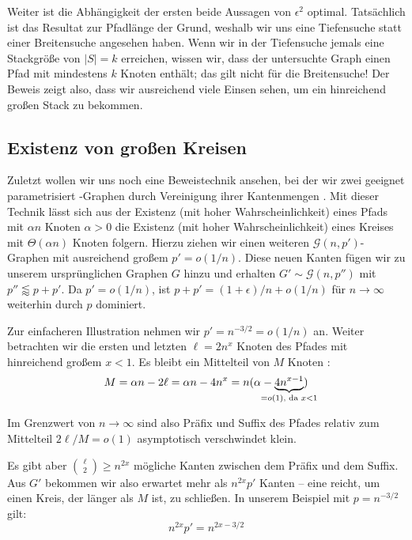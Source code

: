 Weiter ist die Abhängigkeit der ersten beide Aussagen von $\epsilon^2$ optimal.
Tatsächlich ist das Resultat zur Pfadlänge der Grund, weshalb wir uns eine Tiefensuche statt einer Breitensuche angesehen haben.
Wenn wir in der Tiefensuche jemals eine Stackgröße von $|S| = k$ erreichen, wissen wir, dass der untersuchte Graph einen Pfad mit mindestens $k$ Knoten enthält;
das gilt nicht für die Breitensuche!
Der Beweis zeigt also, dass wir ausreichend viele Einsen sehen, um ein hinreichend großen Stack zu bekommen.

\subsection{Existenz von großen Kreisen}
Zuletzt wollen wir uns noch eine Beweistechnik ansehen, bei der wir zwei geeignet parametrisiert \Gnp-Graphen durch Vereinigung ihrer Kantenmengen .
Mit dieser Technik lässt sich aus der Existenz (mit hoher Wahrscheinlichkeit) eines Pfads mit $\alpha n$ Knoten $\alpha > 0$ die Existenz (mit hoher Wahrscheinlichkeit) eines Kreises mit $\Theta(\alpha n)$ Knoten folgern.
Hierzu ziehen wir einen weiteren $\mathcal G(n, p')$-Graphen mit ausreichend großem $p' = o(1/n)$.
Diese neuen Kanten fügen wir zu unserem ursprünglichen Graphen $G$ hinzu und erhalten $G' \sim \mathcal G(n, p'')$ mit $p'' \lessapprox p + p'$.
Da $p' = o(1/n)$, ist $p + p' = (1+\epsilon)/n + o(1/n)$ für $n \to \infty$ weiterhin durch $p$ dominiert.

Zur einfacheren Illustration nehmen wir $p' = n^{-3/2} = o(1/n)$ an.
Weiter betrachten wir die ersten und letzten $\ell = 2 n^x$ Knoten des Pfades mit hinreichend großem $x < 1$.
Es bleibt ein Mittelteil von $M$ Knoten :
\begin{equation}
    M = \alpha n - 2\ell =\alpha n - 4 n^x =  n(\alpha - \underbrace{4n^{x - 1}}_{\mathclap{=o(1)\text{, da } x < 1}} )
\end{equation}

Im Grenzwert von $n\to\infty$ sind also Präfix und Suffix des Pfades relativ zum Mittelteil $2\ell / M = o(1)$ asymptotisch verschwindet klein.

Es gibt aber $\binom{\ell}{2} \ge n^{2x}$ mögliche Kanten zwischen dem Präfix und dem Suffix.
Aus $G'$ bekommen wir also erwartet mehr als $n^{2x} p'$ Kanten -- eine reicht, um einen Kreis, der länger als $M$ ist, zu schließen.
In unserem Beispiel mit $p = n^{-3/2}$ gilt:
\begin{equation}
    n^{2x} p' = n^{2x - 3/2}
\end{equation}

